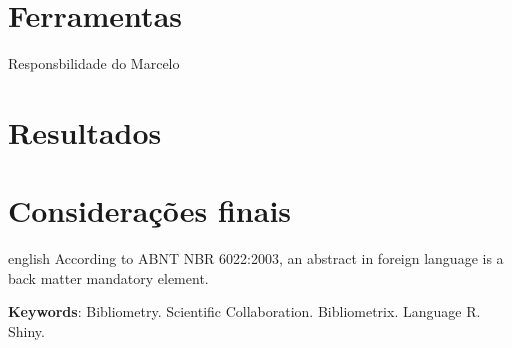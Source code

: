 \documentclass[
	article,			%
	11pt,				%
	oneside,			%
	a4paper,			%
	english,			%
	brazil,				%
	sumario=tradicional
	]{abntex2}
\begin{document}
\section{Ferramentas}
    Responsbilidade do Marcelo
\section{Resultados}

%

\section*{Considerações finais}


\begin{citacao}
\end{citacao}


\postextual



\emptythanks
\maketitle

\renewcommand{\resumoname}{Abstract}
\begin{resumoumacoluna}
 \begin{otherlanguage*}{english}
   According to ABNT NBR 6022:2003, an abstract in foreign language is a back
   matter mandatory element.

   \vspace{\onelineskip}

   \noindent
   \textbf{Keywords}:  Bibliometry. Scientific Collaboration. Bibliometrix. Language R. Shiny.
 \end{otherlanguage*}
\end{resumoumacoluna}
\end{document}
